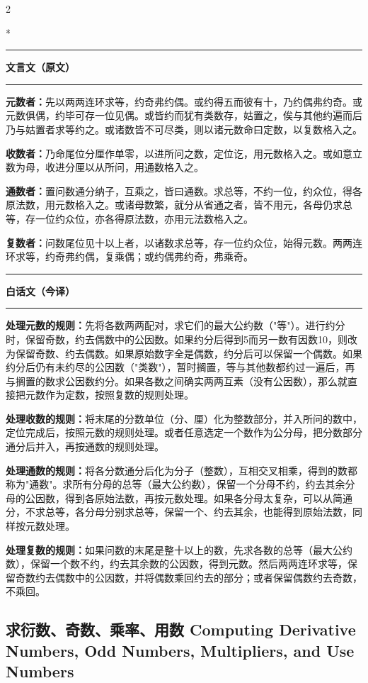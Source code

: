 \documentclass[11pt,a4paper]{article}
\newcommand{\zhtext}[1]{{\chinese #1}}
\newcommand{\leftcolheader}{%
  \noindent\textcolor{leftheader}{\rule{\columnwidth}{1.5pt}}\par
  \vspace{2pt}
  \noindent\textbf{\color{leftheader}\chinese 文言文（原文）}\par
  \vspace{2pt}
  \noindent\textcolor{leftheader}{\rule{\columnwidth}{0.6pt}}\par
  \vspace{4pt}
}
\newcommand{\rightcolheader}{%
  \noindent\textcolor{rightheader}{\rule{\columnwidth}{1.5pt}}\par
  \vspace{2pt}
  \noindent\textbf{\color{rightheader}\chinese 白话文（今译）}\par
  \vspace{2pt}
  \noindent\textcolor{rightheader}{\rule{\columnwidth}{0.6pt}}\par
  \vspace{4pt}
}
\begin{document}
\begin{paracol}{2}

\switchcolumn[0]*\leftcolheader

\small
\textbf{元数者：}先以两两连环求等，约奇弗约偶。或约得五而彼有十，乃约偶弗约奇。或元数俱偶，约毕可存一位见偶。或皆约而犹有类数存，姑置之，俟与其他约遍而后乃与姑置者求等约之。或诸数皆不可尽类，则以诸元数命曰定数，以复数格入之。

\textbf{收数者：}乃命尾位分厘作单零，以进所问之数，定位讫，用元数格入之。或如意立数为母，收进分厘以从所问，用通数格入之。

\textbf{通数者：}置问数通分纳子，互乘之，皆曰通数。求总等，不约一位，约众位，得各原法数，用元数格入之。或诸母数繁，就分从省通之者，皆不用元，各母仍求总等，存一位约众位，亦各得原法数，亦用元法数格入之。

\textbf{复数者：}问数尾位见十以上者，以诸数求总等，存一位约众位，始得元数。两两连环求等，约奇弗约偶，复乘偶；或约偶弗约奇，弗乘奇。

\switchcolumn\rightcolheader

\small\color{prefacecolor}
\textbf{处理元数的规则：}先将各数两两配对，求它们的最大公约数（"等"）。进行约分时，保留奇数，约去偶数中的公因数。如果约分后得到5而另一数有因数10，则改为保留奇数、约去偶数。如果原始数字全是偶数，约分后可以保留一个偶数。如果约分后仍有未约尽的公因数（"类数"），暂时搁置，等与其他数都约过一遍后，再与搁置的数求公因数约分。如果各数之间确实两两互素（没有公因数），那么就直接把元数作为定数，按照复数的规则处理。

\textbf{处理收数的规则：}将末尾的分数单位（分、厘）化为整数部分，并入所问的数中，定位完成后，按照元数的规则处理。或者任意选定一个数作为公分母，把分数部分通分后并入，再按通数的规则处理。

\textbf{处理通数的规则：}将各分数通分后化为分子（整数），互相交叉相乘，得到的数都称为"通数"。求所有分母的总等（最大公约数），保留一个分母不约，约去其余分母的公因数，得到各原始法数，再按元数处理。如果各分母太复杂，可以从简通分，不求总等，各分母分别求总等，保留一个、约去其余，也能得到原始法数，同样按元数处理。

\textbf{处理复数的规则：}如果问数的末尾是整十以上的数，先求各数的总等（最大公约数），保留一个数不约，约去其余数的公因数，得到元数。然后两两连环求等，保留奇数约去偶数中的公因数，并将偶数乘回约去的部分；或者保留偶数约去奇数，不乘回。

\end{paracol}

\subsection{\zhtext{求衍数、奇数、乘率、用数} Computing Derivative Numbers, Odd Numbers, Multipliers, and Use Numbers}
\end{document}
